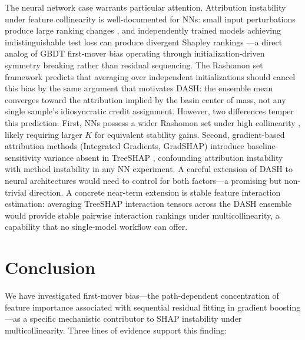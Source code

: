 \documentclass[10pt]{article}
\newcommand{\dash}{\textsc{DASH}}
\begin{document}
The neural network case warrants particular attention. Attribution
instability under feature collinearity is well-documented for NNs:
small input perturbations produce large ranking changes
\citep{ghorbani2019interpretation}, and independently trained models
achieving indistinguishable test loss can produce divergent Shapley
rankings \citep{damour2020underspecification}---a direct analog of
GBDT first-mover bias operating through initialization-driven symmetry
breaking rather than residual sequencing. The Rashomon set framework
\citep{fisher2019all, semenova2022existence} predicts that averaging
over independent initializations should cancel this bias by the same
argument that motivates \dash{}: the ensemble mean converges toward
the attribution implied by the basin center of mass, not any single
sample's idiosyncratic credit assignment. However, two differences
temper this prediction. First, NNs possess a wider Rashomon set under
high collinearity \citep{damour2020underspecification}, likely
requiring larger $K$ for equivalent stability gains. Second,
gradient-based attribution methods (Integrated Gradients, GradSHAP)
introduce baseline-sensitivity variance absent in TreeSHAP
\citep{alvarez2018towards}, confounding attribution instability with
method instability in any NN experiment. A careful extension of \dash{}
to neural architectures would need to control for both factors---a
promising but non-trivial direction. A concrete near-term extension
is stable feature interaction estimation: averaging TreeSHAP interaction
tensors across the \dash{} ensemble would provide stable pairwise
interaction rankings under multicollinearity, a capability that no
single-model workflow can offer.


\section{Conclusion}
\label{sec:conclusion}

We have investigated first-mover bias---the path-dependent concentration of
feature importance associated with sequential residual fitting in gradient
boosting---as a specific mechanistic contributor to SHAP instability under
multicollinearity. Three lines of evidence support this finding:
\end{document}

